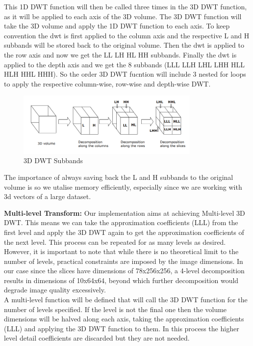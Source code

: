 \documentclass{article}
\begin{document}
This 1D DWT function will then be called three times in the 3D DWT function, as it will be applied to each axis of the 3D volume. The 3D DWT function will take the 3D volume and apply the 1D DWT function to each axis. To keep convention the dwt is first applied to the column axis and the respective L and H subbands will be stored back to the original volume. Then the dwt is applied to the row axis and now we get the LL LH HL HH subbands. Finally the dwt is applied to the depth axis and we get the 8 subbands (LLL LLH LHL LHH HLL HLH HHL HHH). So the order 3D DWT fucntion will include 3 nested for loops to apply the respective column-wise, row-wise and depth-wise DWT.\\

\begin{figure}
    \centering
    \includegraphics[width=0.8\textwidth]{assets/subbands.png}
    \caption{3D DWT Subbands \cite{Prochazka2011}}
    \label{fig3}
\end{figure}

The importance of always saving back the L and H subbands to the original volume is so we utalise memory efficiently, especially since we are working with 3d vectors of a large dataset.

\textbf{Multi-level Transform:} Our implementation aims at achieving Multi-level 3D DWT. This means we can take the approximation coefficients (LLL) from the first level and apply the 3D DWT again to get the approximation coefficients of the next level. This process can be repeated for as many levels as desired. However, it is important to note that while there is no theoretical limit to the number of levels, practical constraints are imposed by the image dimensions. In our case since the slices have dimensions of 78x256x256, a 4-level decomposition results in dimensions of 10x64x64, beyond which further decomposition would degrade image quality excessively.\\

A multi-level function will be defined that will call the 3D DWT function for the number of levels specified. If the level is not the final one then the volume dimensions will be halved along each axis, taking the approximation coefficients (LLL) and applying the 3D DWT function to them. In this process the higher level detail coefficients are discarded but they are not needed.\\
 
\end{document}
